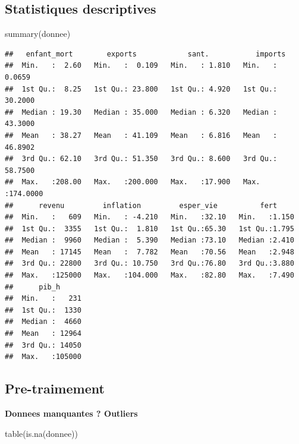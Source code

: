 \documentclass[
]{article}
\newenvironment{Shaded}{}{}
\newcommand{\FunctionTok}[1]{#1}
\newcommand{\NormalTok}[1]{#1}
\begin{document}
\hypertarget{statistiques-descriptives}{%
\subsection{Statistiques descriptives}\label{statistiques-descriptives}}

\begin{Shaded}
\begin{Highlighting}[]
\FunctionTok{summary}\NormalTok{(donnee)}
\end{Highlighting}
\end{Shaded}

\begin{verbatim}
##   enfant_mort        exports            sant.           imports        
##  Min.   :  2.60   Min.   :  0.109   Min.   : 1.810   Min.   :  0.0659  
##  1st Qu.:  8.25   1st Qu.: 23.800   1st Qu.: 4.920   1st Qu.: 30.2000  
##  Median : 19.30   Median : 35.000   Median : 6.320   Median : 43.3000  
##  Mean   : 38.27   Mean   : 41.109   Mean   : 6.816   Mean   : 46.8902  
##  3rd Qu.: 62.10   3rd Qu.: 51.350   3rd Qu.: 8.600   3rd Qu.: 58.7500  
##  Max.   :208.00   Max.   :200.000   Max.   :17.900   Max.   :174.0000  
##      revenu         inflation         esper_vie          fert      
##  Min.   :   609   Min.   : -4.210   Min.   :32.10   Min.   :1.150  
##  1st Qu.:  3355   1st Qu.:  1.810   1st Qu.:65.30   1st Qu.:1.795  
##  Median :  9960   Median :  5.390   Median :73.10   Median :2.410  
##  Mean   : 17145   Mean   :  7.782   Mean   :70.56   Mean   :2.948  
##  3rd Qu.: 22800   3rd Qu.: 10.750   3rd Qu.:76.80   3rd Qu.:3.880  
##  Max.   :125000   Max.   :104.000   Max.   :82.80   Max.   :7.490  
##      pib_h       
##  Min.   :   231  
##  1st Qu.:  1330  
##  Median :  4660  
##  Mean   : 12964  
##  3rd Qu.: 14050  
##  Max.   :105000
\end{verbatim}

\hypertarget{pre-traimement}{%
\subsection{Pre-traimement}\label{pre-traimement}}

\textbf{Donnees manquantes ? Outliers}

\begin{Shaded}
\begin{Highlighting}[]
\FunctionTok{table}\NormalTok{(}\FunctionTok{is.na}\NormalTok{(donnee))}
\end{Highlighting}
\end{Shaded}
\end{document}
